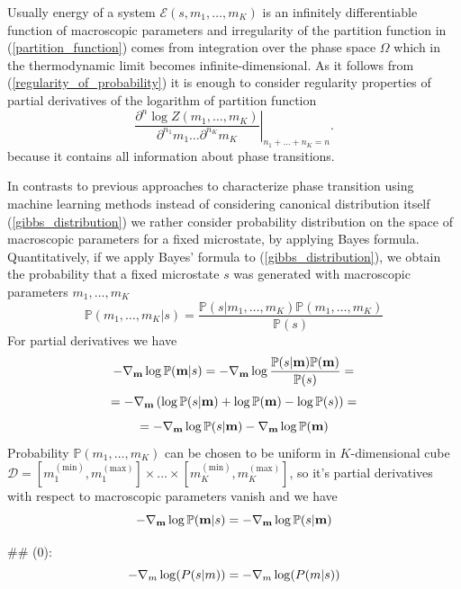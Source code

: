 \documentclass[aps,a4paper,twocolumn,showpacs]{revtex4}
\newcommand{\eq}[1]{(\ref{#1})}
\begin{document}
\par Usually energy of a system $\mathcal{E}(s, m_1, \dots, m_K)$ is an infinitely differentiable function of macroscopic parameters and irregularity of the partition function in \eq{partition_function} comes from integration over the phase space $\Omega$ which in the thermodynamic limit becomes infinite-dimensional. As it follows from \eq{regularity_of_probability} it is enough to consider regularity properties of partial derivatives of the logarithm of partition function
$$
\left. \frac{\partial^{n} \log Z(m_1, \dots, m_K)}{\partial^{n_1}m_{1} \dots \partial^{n_K}m_{K}}\right|_{n_1+\dots +n_K = n}.
$$
because it contains all information about phase transitions.
\par In contrasts to previous approaches to characterize phase transition using machine learning methods instead of considering canonical distribution itself \eq{gibbs_distribution} we rather consider probability distribution on the space of macroscopic parameters for a fixed microstate, by applying Bayes formula. Quantitatively, if we apply Bayes' formula to \eq{gibbs_distribution}, we obtain the probability that a fixed microstate $ s $ was generated with macroscopic parameters $ m_1, \dots, m_K $
\begin{equation}
    \mathbb{P}(m_1, \dots, m_K|s) = \frac{\mathbb{P}(s|m_1, \dots, m_K)\mathbb{P}(m_1, \dots, m_K) }{\mathbb{P}(s)}
    \label{bayes_formula}
\end{equation}
For partial derivatives we have
$$
- \nabla_{\bold{m}} \log \mathbb{P}(\bold{m}|s) = - \nabla_{\bold{m}} \log \frac{\mathbb{P}(s|\bold{m})\mathbb{P}(\bold{m})}{\mathbb{P}(s)} = 
$$
$$
= - \nabla_{\bold{m}} \left(\log \mathbb{P}(s|\bold{m}) +\log \mathbb{P}(\bold{m}) - \log \mathbb{P}(s) \right) =
$$
$$
= - \nabla_{\bold{m}} \log \mathbb{P}(s|\bold{m}) -\nabla_{\bold{m}} \log \mathbb{P}(\bold{m})
$$
Probability $\mathbb{P}(m_1, \dots, m_K)$ can be chosen to be  uniform in $K$-dimensional cube $\mathcal{D} = [m_1^{(\text{min})}, m_1^{(\text{max})}]\times \dots \times [m_K^{(\text{min})}, m_K^{(\text{max})}]$, so it's partial derivatives with respect to macroscopic parameters vanish and we have
\begin{equation}
    - \nabla_{\bold{m}} \log \mathbb{P}(\bold{m}|s) = - \nabla_{\bold{m}} \log \mathbb{P}(s|\bold{m})
    \label{rgularity_from_bayes_formula}
\end{equation}

## (0):
$$
\huge{
-\nabla_{m}\log(P(s|m)) = -\nabla_{m}\log(P(m|s))
}
$$
\end{document}

